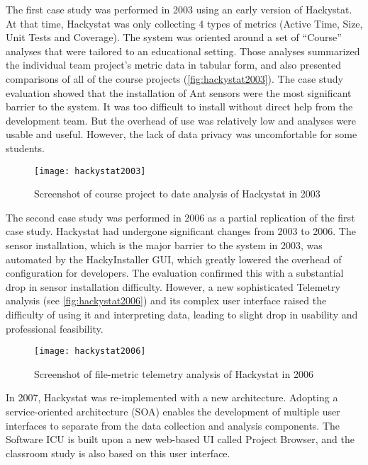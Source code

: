 The first case study was performed in 2003 using an early version of Hackystat\cite{csdl2-03-13}. At that time, Hackystat was only collecting 4 types of metrics (Active Time, Size, Unit Tests and Coverage). The system was oriented around a set of ``Course'' analyses that were tailored to an educational setting. Those analyses summarized the individual team project's metric data in tabular form, and also presented comparisons of all of the course projects (\autoref{fig:hackystat2003}). The case study evaluation showed that the installation of Ant sensors were the most significant barrier to the system. It was too difficult to install without direct help from the development team. But the overhead of use was relatively low and analyses were usable and useful. However, the lack of data privacy was uncomfortable for some students.

\begin{figure}[htbp]
   \centering
   \texttt{[image: hackystat2003]} 
   \caption{Screenshot of course project to date analysis of Hackystat in 2003}
   \label{fig:hackystat2003}
\end{figure}

The second case study was performed in 2006 as a partial replication of the first case study\cite{csdl2-07-02}. Hackystat had undergone significant changes from 2003 to 2006. The sensor installation, which is the major barrier to the system in 2003, was automated by the HackyInstaller GUI, which greatly lowered the overhead of configuration for developers. The evaluation confirmed this with a substantial drop in sensor installation difficulty. However, a new sophisticated Telemetry analysis (see \autoref{fig:hackystat2006}) and its complex user interface raised the difficulty of using it and interpreting data, leading to slight drop in usability and professional feasibility.

\begin{figure}[htbp]
   \centering
   \texttt{[image: hackystat2006]} 
   \caption{Screenshot of file-metric telemetry analysis of Hackystat in 2006}
   \label{fig:hackystat2006}
\end{figure}

In 2007, Hackystat was re-implemented with a new architecture. Adopting a service-oriented architecture (SOA)\cite{soa} enables the development of multiple user interfaces to separate from the data collection and analysis components. The Software ICU is built upon a new web-based UI called Project Browser, and the classroom study is also based on this user interface.


